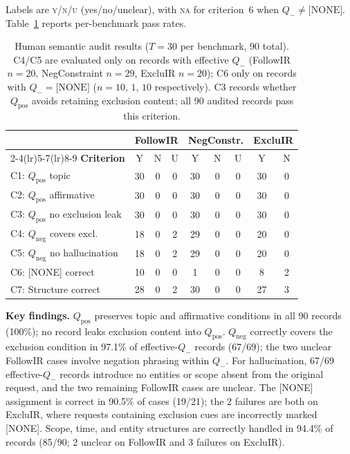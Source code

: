 \documentclass[letterpaper]{article}
\newcommand{\qpos}{Q_{\text{pos}}}
\newcommand{\qneg}{Q_{\text{neg}}}
\newcommand{\qminus}{Q_{-}}
\begin{document}
\noindent
Labels are \textsc{y}/\textsc{n}/\textsc{u} (yes/no/unclear), with
\textsc{na} for criterion~6 when $\qminus\neq\text{[NONE]}$.
Table~\ref{tab:semantic-audit} reports per-benchmark pass rates.

\begin{table}[t]
\centering
\small
\setlength{\tabcolsep}{2.5pt}
\begin{tabular}{l ccc ccc cc}
\toprule
& \multicolumn{3}{c}{\textbf{FollowIR}} &
\multicolumn{3}{c}{\textbf{NegConstr.}} &
\multicolumn{2}{c}{\textbf{ExcluIR}} \\
\cmidrule(lr){2-4}\cmidrule(lr){5-7}\cmidrule(lr){8-9}
\textbf{Criterion} & Y & N & U & Y & N & U & Y & N \\
\midrule
C1: $\qpos$ topic            & 30 & 0 & 0 & 30 & 0 & 0 & 30 & 0 \\
C2: $\qpos$ affirmative      & 30 & 0 & 0 & 30 & 0 & 0 & 30 & 0 \\
C3: $\qpos$ no exclusion leak & 30 & 0 & 0 & 30 & 0 & 0 & 30 & 0 \\
C4: $\qneg$ covers excl.\    & 18 & 0 & 2 & 29 & 0 & 0 & 20 & 0 \\
C5: $\qneg$ no hallucination  & 18 & 0 & 2 & 29 & 0 & 0 & 20 & 0 \\
C6: [NONE] correct           & 10 & 0 & 0 &  1 & 0 & 0 &  8 & 2 \\
C7: Structure correct        & 28 & 0 & 2 & 30 & 0 & 0 & 27 & 3 \\
\bottomrule
\end{tabular}
\caption{Human semantic audit results ($T{=}30$ per benchmark, 90 total).
C4/C5 are evaluated only on records with effective $\qminus$
(FollowIR $n{=}20$, NegConstraint $n{=}29$, ExcluIR $n{=}20$);
C6 only on records with $\qminus{=}\text{[NONE]}$
($n{=}10$, $1$, $10$ respectively).
C3 records whether $\qpos$ avoids retaining exclusion content; all
90 audited records pass this criterion.}
\label{tab:semantic-audit}
\end{table}

\noindent\textbf{Key findings.}
$\qpos$ preserves topic and affirmative conditions in all 90 records
(100\%); no record leaks exclusion content into $\qpos$.
$\qneg$ correctly covers the exclusion condition in 97.1\% of
effective-$\qminus$ records (67/69); the two unclear FollowIR cases
involve negation phrasing within $\qminus$.
For hallucination, 67/69 effective-$\qminus$ records introduce no
entities or scope absent from the original request, and the two
remaining FollowIR cases are unclear.
The [NONE] assignment is correct in 90.5\% of cases (19/21);
the 2 failures are both on ExcluIR, where requests containing
exclusion cues are incorrectly marked [NONE].
Scope, time, and entity structures are correctly handled in 94.4\%
of records (85/90; 2 unclear on FollowIR and 3 failures on ExcluIR).
\end{document}
